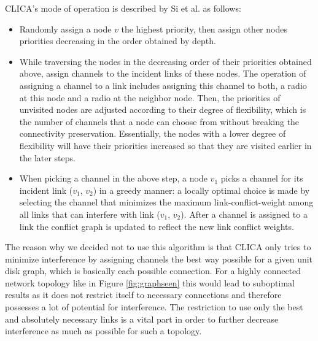     CLICA's mode of operation is described by Si et al. \cite{overview_caa} as follows:
    \begin{itemize}
      \item Randomly assign a node \(v\) the highest priority, then assign other
	nodes priorities decreasing in the order obtained by depth.
	
      \item While traversing the nodes in the decreasing order of their
	priorities obtained above, assign channels to the incident links
	of these nodes. The operation of assigning a channel to a link
	includes assigning this channel to both, a radio at this node and
	a radio at the neighbor node. Then, the priorities of unvisited
	nodes are adjusted according to their degree of flexibility, which
	is the number of channels that a node can choose from without
	breaking the connectivity preservation. Essentially, the nodes
	with a lower degree of flexibility will have their priorities
	increased so that they are visited earlier in the later steps.
	
      \item When picking a channel in the above step, a node \(v_1\) picks
	a channel for its incident link (\(v_1\), \(v_2\)) in a greedy manner: a
	locally optimal choice is made by selecting the channel that
	minimizes the maximum link-conflict-weight among all links
	that can interfere with link (\(v_1\), \(v_2\)). After a channel is assigned
	to a link the conflict graph is updated to reflect the new link conflict weights.
    \end{itemize}
  
    The reason why we decided not to use this algorithm is that \ac{CLICA} only tries to minimize interference by assigning channels the best way possible for a given
    unit disk graph, which is basically each possible connection. For a highly connected network topology like in Figure \ref{fig:graphseen} this would lead to suboptimal results
    as it does not restrict itself to necessary connections and therefore possesses a lot of potential for interference.
    The restriction to use only the best and absolutely necessary links is a vital part in order to 
    further decrease interference as much as possible for such a topology.
    
